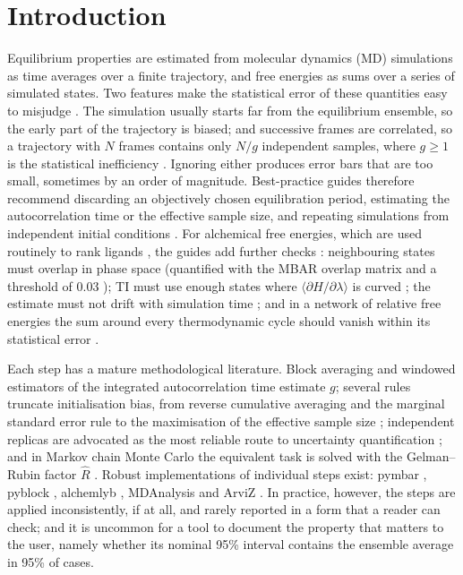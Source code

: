 \documentclass[9pt,lessons]{livecoms}
\begin{document}
\section{Introduction}
Equilibrium properties are estimated from molecular dynamics (MD) simulations as time averages over a finite trajectory, and free energies as sums over a series of simulated states. Two features make the statistical error of these quantities easy to misjudge \cite{schiferl1985,straatsma1986,flyvbjerg1989error,allen2017,frenkel2002}. The simulation usually starts far from the equilibrium ensemble, so the early part of the trajectory is biased; and successive frames are correlated, so a trajectory with $N$ frames contains only $N/g$ independent samples, where $g \ge 1$ is the statistical inefficiency \cite{mullerkrumbhaar1973,sokal1997,janke2002}. Ignoring either produces error bars that are too small, sometimes by an order of magnitude. Best-practice guides therefore recommend discarding an objectively chosen equilibration period, estimating the autocorrelation time or the effective sample size, and repeating simulations from independent initial conditions \cite{grossfield2009,grossfield2018best,braun2019,knapp2018is}. For alchemical free energies, which are used routinely to rank ligands \cite{wang2015,cournia2017,mobley2017,schindler2020}, the guides add further checks \cite{pohorille2010,chodera2011,klimovich2015,mey2020}: neighbouring states must overlap in phase space (quantified with the MBAR overlap matrix and a threshold of 0.03 \cite{klimovich2015}); TI must use enough states where $\langle \partial H/\partial\lambda\rangle$ is curved \cite{paliwal2011,bruckner2011}; the estimate must not drift with simulation time \cite{klimovich2015,chodera2016}; and in a network of relative free energies the sum around every thermodynamic cycle should vanish within its statistical error \cite{wang2013,wang2015,hahn2022}.

Each step has a mature methodological literature. Block averaging \cite{flyvbjerg1989error,lee2011} and windowed estimators of the integrated autocorrelation time \cite{madras1988,sokal1997,geyer1992,wolff2004} estimate $g$; several rules truncate initialisation bias, from reverse cumulative averaging \cite{yang2004} and the marginal standard error rule \cite{white1997} to the maximisation of the effective sample size \cite{chodera2016simple}; independent replicas are advocated as the most reliable route to uncertainty quantification \cite{coveney2016,bhati2017,wan2021}; and in Markov chain Monte Carlo the equivalent task is solved with the Gelman--Rubin factor $\hat{R}$ \cite{gelman1992,brooks1998,vehtari2021}. Robust implementations of individual steps exist: pymbar \cite{shirts2008mbar,chodera2016simple}, pyblock \cite{lee2011}, alchemlyb \cite{wu2024alchemlyb,klimovich2015,mey2020,wu2024}, MDAnalysis \cite{michaud2011} and ArviZ \cite{kumar2019}. In practice, however, the steps are applied inconsistently, if at all, and rarely reported in a form that a reader can check; and it is uncommon for a tool to document the property that matters to the user, namely whether its nominal 95\% interval contains the ensemble average in 95\% of cases.
\end{document}
